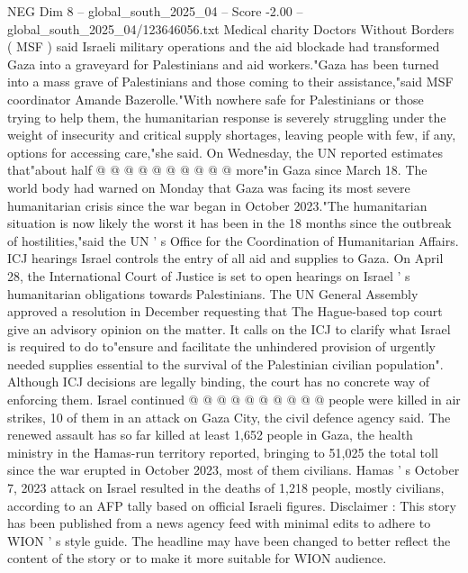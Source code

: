 \begin{textsample}{NEG Dim 8 – global\_south\_2025\_04 – Score -2.00 – global\_south\_2025\_04/123646056.txt}
Medical charity Doctors Without Borders ( MSF ) said Israeli military operations and the aid blockade had transformed Gaza into a graveyard for Palestinians and aid workers."Gaza has been turned into a mass grave of Palestinians and those coming to their assistance,"said MSF coordinator Amande Bazerolle."With nowhere safe for Palestinians or those trying to help them, the humanitarian response is severely struggling under the weight of insecurity and critical supply shortages, leaving people with few, if any, options for accessing care,"she said.
On Wednesday, the UN reported estimates that"about half @ @ @ @ @ @ @ @ @ @ more"in Gaza since March 18.
The world body had warned on Monday that Gaza was facing its most severe humanitarian crisis since the war began in October 2023."The humanitarian situation is now likely the worst it has been in the 18 months since the outbreak of hostilities,"said the UN ' s Office for the Coordination of Humanitarian Affairs.
ICJ hearings Israel controls the entry of all aid and supplies to Gaza.
On April 28, the International Court of Justice is set to open hearings on Israel ' s humanitarian obligations towards Palestinians.
The UN General Assembly approved a resolution in December requesting that The Hague-based top court give an advisory opinion on the matter.
It calls on the ICJ to clarify what Israel is required to do to"ensure and facilitate the unhindered provision of urgently needed supplies essential to the survival of the Palestinian civilian population".
Although ICJ decisions are legally binding, the court has no concrete way of enforcing them.
Israel continued @ @ @ @ @ @ @ @ @ @ people were killed in air strikes, 10 of them in an attack on Gaza City, the civil defence agency said.
The renewed assault has so far killed at least 1,652 people in Gaza, the health ministry in the Hamas-run territory reported, bringing to 51,025 the total toll since the war erupted in October 2023, most of them civilians.
Hamas ' s October 7, 2023 attack on Israel resulted in the deaths of 1,218 people, mostly civilians, according to an AFP tally based on official Israeli figures.
Disclaimer : This story has been published from a news agency feed with minimal edits to adhere to WION ' s style guide.
The headline may have been changed to better reflect the content of the story or to make it more suitable for WION audience.

\end{textsample}

